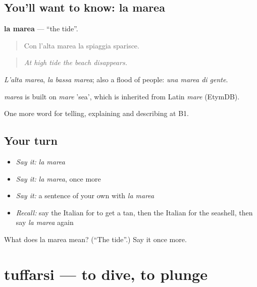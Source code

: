 \subsection*{You'll want to know: la marea}
\textbf{la marea} — \textquotedblleft{}the tide\textquotedblright{}.

\begin{quote}
Con l'alta marea la spiaggia sparisce.
\end{quote}

\begin{quote}
\emph{At high tide the beach disappears.}
\end{quote}

\emph{L'alta marea}, \emph{la bassa marea}; also a flood of people: \emph{una marea di gente}.

\begin{cousinweb}
\emph{marea} is built on \emph{mare} 'sea', which is inherited from Latin \emph{mare} (EtymDB).
\end{cousinweb}

\begin{grammarlens}[title={What you've built}]
One more word for telling, explaining and describing at B1.
\end{grammarlens}

\subsection*{Your turn}
\begin{itemize}
\raggedright
  \item \emph{Say it:} \emph{la marea}
  \item \emph{Say it:} \emph{la marea}, once more
  \item \emph{Say it:} a sentence of your own with \emph{la marea}
  \item \emph{Recall:} say the Italian for to get a tan, then the Italian for the seashell, then say \emph{la marea} again
\end{itemize}

\begin{tcolorbox}[breakable,colback=teal!4,colframe=teal!35!black,title={Before you move on}]
What does la marea mean? (\textquotedblleft{}The tide\textquotedblright{}.) Say it once more.
\end{tcolorbox}
\section[tuffarsi]{tuffarsi — to dive, to plunge}

